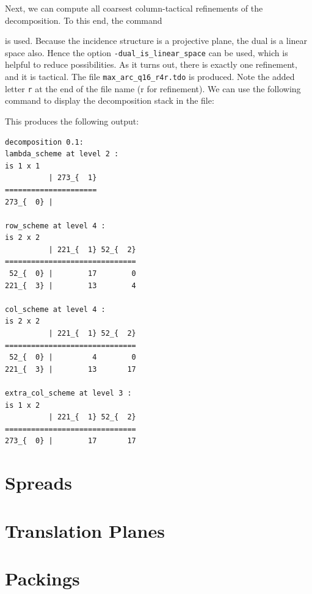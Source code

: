 Next, we can compute all coarsest column-tactical refinements of the decomposition. 
To this end, the command 
{\tt

}
is used. 
Because the incidence structure is a projective plane, the dual is a linear space also. 
Hence the option \verb'-dual_is_linear_space' can be used, which is helpful to reduce possibilities. 
As it turns out, there is exactly one refinement, and it is tactical. 
The file \verb'max_arc_q16_r4r.tdo' is produced. 
Note the added letter \verb'r' at the end of the file name (r for refinement).
We can use the following command to display the decomposition stack in the file:
{\tt

}
This produces the following output:
\begin{verbatim}
decomposition 0.1:
lambda_scheme at level 2 : 
is 1 x 1
          | 273_{  1}
=====================
273_{  0} | 

row_scheme at level 4 : 
is 2 x 2
          | 221_{  1} 52_{  2}
==============================
 52_{  0} |        17        0
221_{  3} |        13        4

col_scheme at level 4 : 
is 2 x 2
          | 221_{  1} 52_{  2}
==============================
 52_{  0} |         4        0
221_{  3} |        13       17

extra_col_scheme at level 3 : 
is 1 x 2
          | 221_{  1} 52_{  2}
==============================
273_{  0} |        17       17
\end{verbatim}


\section{Spreads}
\label{sec:spreads}




\bigskip

\clearpage


\section{Translation Planes}
\label{sec:translation:planes}




\bigskip

\clearpage


\section{Packings}
\label{sec:packings}


